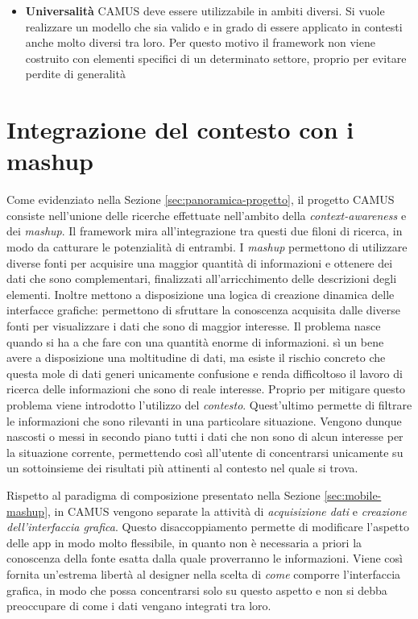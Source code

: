 \begin{itemize}
	\item \textbf{Universalità}
	CAMUS deve essere utilizzabile in ambiti diversi. Si vuole realizzare un modello che sia valido e in grado di essere applicato in contesti anche molto diversi tra loro. Per questo motivo il framework non viene costruito con elementi specifici di un determinato settore, proprio per evitare perdite di generalità
\end{itemize}

\section{Integrazione del contesto con i mashup\label{sec:integrazione-contesto-mashup}}

Come evidenziato nella Sezione \ref{sec:panoramica-progetto}, il progetto CAMUS consiste nell'unione delle ricerche effettuate nell'ambito della \emph{context-awareness} e dei \emph{mashup}. Il framework mira all'integrazione tra questi due filoni di ricerca, in modo da catturare le potenzialità di entrambi. I \emph{mashup} permettono di utilizzare diverse fonti per acquisire una maggior quantità di informazioni e ottenere dei dati che sono complementari, finalizzati all'arricchimento delle descrizioni degli elementi. Inoltre mettono a disposizione una logica di creazione dinamica delle interfacce grafiche: permettono di sfruttare la conoscenza acquisita dalle diverse fonti per visualizzare i dati che sono di maggior interesse. Il problema nasce quando si ha a che fare con una quantità enorme di informazioni. \upe sì un bene avere a disposizione una moltitudine di dati, ma esiste il rischio concreto che questa mole di dati generi unicamente confusione e renda difficoltoso il lavoro di ricerca delle informazioni che sono di reale interesse. Proprio per mitigare questo problema viene introdotto l'utilizzo del \emph{contesto}. Quest'ultimo permette di filtrare le informazioni che sono rilevanti in una particolare situazione. Vengono dunque nascosti o messi in secondo piano tutti i dati che non sono di alcun interesse per la situazione corrente, permettendo così all'utente di concentrarsi unicamente su un sottoinsieme dei risultati più attinenti al contesto nel quale si trova.

Rispetto al paradigma di composizione presentato nella Sezione \ref{sec:mobile-mashup}, in CAMUS vengono separate la attività di \emph{acquisizione dati} e \emph{creazione dell'interfaccia grafica}. Questo disaccoppiamento permette di modificare l'aspetto delle app in modo molto flessibile, in quanto non è necessaria a priori la conoscenza della fonte esatta dalla quale proverranno le informazioni. Viene così fornita un'estrema libertà al designer nella scelta di \emph{come} comporre l'interfaccia grafica, in modo che possa concentrarsi solo su questo aspetto e non si debba preoccupare di come i dati vengano integrati tra loro.

